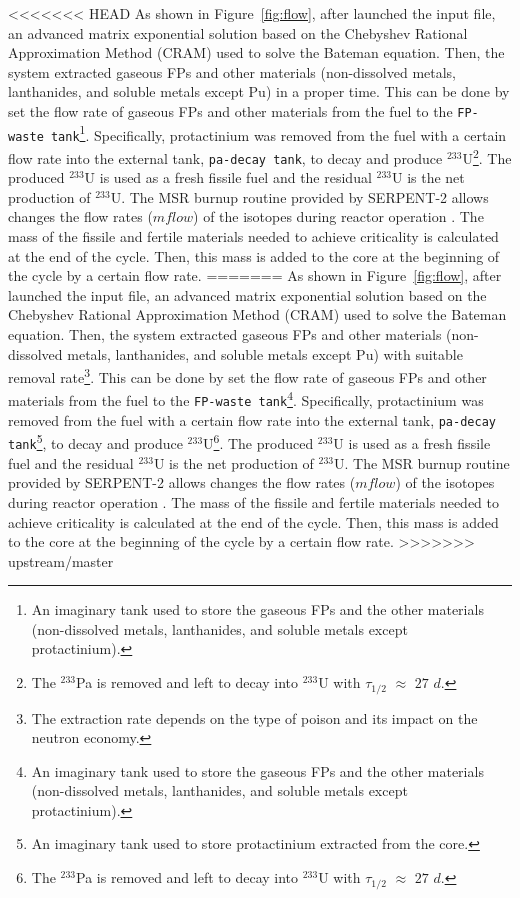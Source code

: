 <<<<<<< HEAD
As shown in Figure~\ref{fig:flow}, after launched the input file, an advanced matrix exponential solution based on the Chebyshev Rational Approximation Method (CRAM) \cite{isotalo2016improving} used to solve the Bateman equation. Then, the system extracted gaseous \gls{FPs} and other materials (non-dissolved metals, lanthanides, and soluble metals except Pu) in a proper time. This can be done by set the flow rate of gaseous \gls{FPs} and other materials from the fuel to the \texttt{FP-waste tank}\footnote{An imaginary tank used to store the gaseous \gls{FPs} and the other materials (non-dissolved metals, lanthanides, and soluble metals except protactinium).}. Specifically, protactinium was removed from the fuel with a certain flow rate into the external tank, \texttt{pa-decay tank}, to decay and produce $^{233}$U\footnote{The $^{233}$Pa is removed and left to decay into $^{233}$U with $\tau_{1/2}$ $\approx$ $27$ $d$.}. The produced $^{233}$U is used as a fresh fissile fuel and the residual $^{233}$U is the net production of $^{233}$U. The MSR burnup routine provided by SERPENT-2 allows changes the flow rates ($mflow$) of the isotopes during reactor operation \cite{aufiero2013extended}. The mass of the fissile and fertile materials needed to achieve criticality is calculated at the end of the cycle. Then, this mass is added to the core at the beginning of the cycle by a certain flow rate.
=======
As shown in Figure~\ref{fig:flow}, after launched the input file, an advanced 
matrix exponential solution based on the Chebyshev Rational Approximation 
Method (CRAM) \cite{isotalo2016improving} used to solve the Bateman equation. 
Then, the system extracted gaseous \gls{FPs} and other materials 
(non-dissolved metals, lanthanides, and soluble metals except Pu) with 
suitable removal rate\footnote{The extraction rate depends on the type of 
poison and its impact on the neutron
economy.}. This can be done by set the 
flow rate of gaseous \gls{FPs} and other materials from the fuel to the 
\texttt{FP-waste tank}\footnote{An imaginary tank used to store the gaseous 
\gls{FPs} and the other materials (non-dissolved metals, lanthanides, and 
soluble metals except protactinium).}. Specifically, protactinium was removed 
from the fuel with a certain flow rate into the external tank, 
\texttt{pa-decay tank}\footnote{An imaginary tank used to store protactinium 
extracted from the core.}, to decay and produce $^{233}$U\footnote{The 
$^{233}$Pa is removed and left to decay into $^{233}$U with $\tau_{1/2}$ 
$\approx$ $27$ $d$.}. The produced $^{233}$U is used as a fresh fissile fuel 
and the residual $^{233}$U is the net production of $^{233}$U. The MSR burnup 
routine provided by SERPENT-2 allows changes the flow rates ($mflow$) of the 
isotopes during reactor operation \cite{aufiero2013extended}. The mass of the 
fissile and fertile materials needed to achieve criticality is calculated at 
the end of the cycle. Then, this mass is added to the core at the beginning of 
the cycle by a certain flow rate.
>>>>>>> upstream/master

